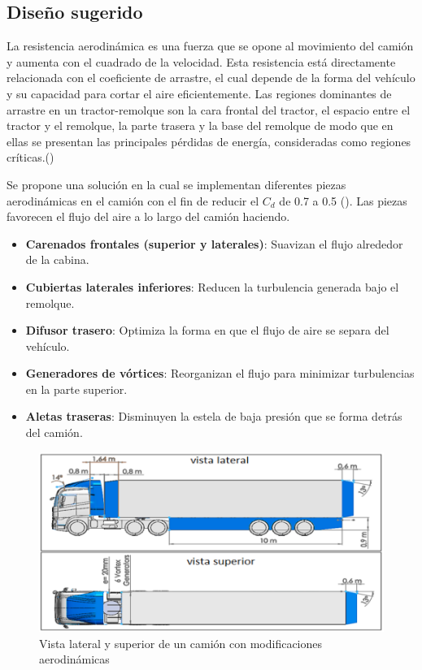\documentclass[11pt,stdletter,orderfromtodate,sigleft,twoside]{report}
\begin{document}
\subsection{Diseño sugerido}

La resistencia aerodinámica es una fuerza que se opone al movimiento del camión y aumenta con el cuadrado de la velocidad. Esta resistencia está directamente relacionada con el coeficiente de arrastre, el cual depende de la forma del vehículo y su capacidad para cortar el aire eficientemente. Las regiones dominantes de arrastre en un tractor-remolque son la cara frontal del tractor, el
espacio entre el tractor y el remolque, la parte trasera y la base del remolque de modo que en ellas se
presentan las principales pérdidas de energía, consideradas como regiones críticas.(\cite{Aeroreduct})

Se propone una solución en la cual se implementan diferentes piezas aerodinámicas en el camión con el fin de reducir el \(C_d\) de 0.7 a 0.5 (\cite{Aeroreduct}). Las piezas favorecen el flujo del aire a lo largo del camión haciendo.

\begin{itemize}
    \item \textbf{Carenados frontales (superior y laterales)}: Suavizan el flujo alrededor de la cabina.
    \item \textbf{Cubiertas laterales inferiores}: Reducen la turbulencia generada bajo el remolque.
    \item \textbf{Difusor trasero}: Optimiza la forma en que el flujo de aire se separa del vehículo.
    \item \textbf{Generadores de vórtices}: Reorganizan el flujo para minimizar turbulencias en la parte superior.
    \item \textbf{Aletas traseras}: Disminuyen la estela de baja presión que se forma detrás del camión.
\end{itemize}

\begin{figure}[H]
    \centering
    \includegraphics[width=0.55\linewidth]{figures//Cars/Aero truck.png}
    \caption{Vista lateral y superior de un camión con modificaciones aerodinámicas}
    \label{fig:enter-label}
\end{figure}
\end{document}
